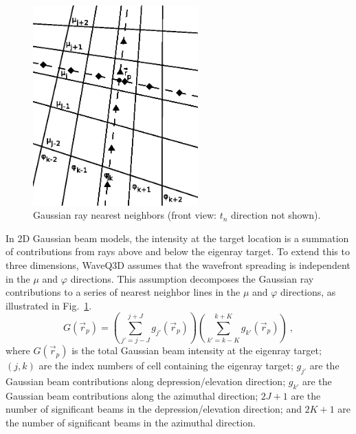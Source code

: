 \documentclass{ws-jca}
\newcommand{\twoD}{2\nobreakdash\textendash D }	%
\begin{document}
\begin{figure}[th]
	\centerline{\includegraphics[width=2.5in]{GaussianGeometry.eps}} 
	\vspace*{8pt}
	\caption{Gaussian ray nearest neighbors 
		(front view: \(t_n\) direction not shown).}
	\label{fig:ray_neighbors}
\end{figure}
In \twoD Gaussian beam models, the intensity at the target location is a summation of contributions from rays above and below the eigenray target. To extend this to three dimensions, WaveQ3D assumes that the wavefront spreading is independent in the \(\mu\) and \(\varphi\) directions. This assumption decomposes the Gaussian ray contributions to a series of nearest neighbor lines in the \(\mu\) and \(\varphi\) directions, as illustrated in Fig.~\ref{fig:ray_neighbors}.
\begin{equation}
	G(\vec{r}_p) = \left( \sum_{j'=j-J}^{j+J} g_{j'}(\vec{r}_p)\right) 
		\left( \sum_{k'=k-K}^{k+K} g_{k'}(\vec{r}_p)\right) \:,
	\label{eq:gaussian_sum}
\end{equation}
where
\(G(\vec{r}_p)\) is the total Gaussian beam intensity at the eigenray target;
$(j,k)$ are the index numbers of cell containing the eigenray target;
\(g_{j'}\) are the Gaussian beam contributions along depression/elevation direction;
\(g_{k'}\) are the Gaussian beam contributions along the azimuthal direction;
$2J+1$ are the number of significant beams in the depression/elevation direction; and
$2K+1$ are the number of significant beams in the azimuthal direction.
\end{document}
